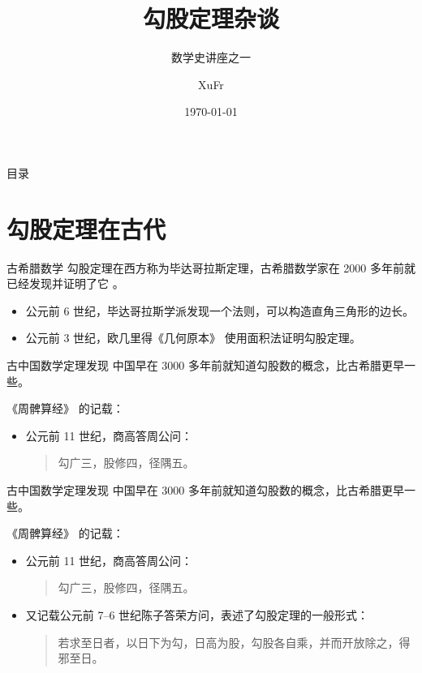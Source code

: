 \documentclass{beamer}
\title{勾股定理杂谈}
\subtitle{数学史讲座之一}
\institute{九章学堂}
\author{XuFr}
\date{\today}
\begin{document}
	\begin{frame}
		\titlepage%
	\end{frame}
	\begin{frame}{目录}
		\tableofcontents
	\end{frame}
	\section{勾股定理在古代}
	\begin{frame}{古希腊数学}
		勾股定理在西方称为毕达哥拉斯定理，古希腊数学家在 2000 多年前就已经发现并证明了它 \cite{Kline}。
		\begin{itemize}
			\item 公元前 6 世纪，毕达哥拉斯学派发现一个法则，可以构造直角三角形的边长。
			\item 公元前 3 世纪，欧几里得《几何原本》 使用面积法证明勾股定理。
		\end{itemize}
	\end{frame}
	\begin{frame}{古中国数学}{定理发现}
		中国早在 3000 多年前就知道勾股数的概念，比古希腊更早一些。
		
		《周髀算经》 的记载：
		\begin{itemize}
			\item 公元前 11 世纪，商高答周公问：
			\begin{quote}
				\zihao{-5}\kaishu
				勾广三，股修四，径隅五。
			\end{quote}
		\end{itemize}
	\end{frame}
\begin{frame}{古中国数学}{定理发现}
	中国早在 3000 多年前就知道勾股数的概念，比古希腊更早一些。
	
	《周髀算经》 的记载：
	\begin{itemize}
		\item 公元前 11 世纪，商高答周公问：
		\begin{quote}
			\kaishu
			勾广三，股修四，径隅五。
		\end{quote}
		\item 又记载公元前 7--6 世纪陈子答荣方问，表述了勾股定理的一般形式：
		\begin{quote}
			\kaishu 
			若求至日者，以日下为勾，日高为股，勾股各自乘，并而开放除之，得邪至日。
		\end{quote}
	\end{itemize}

\end{frame}
\end{document}
